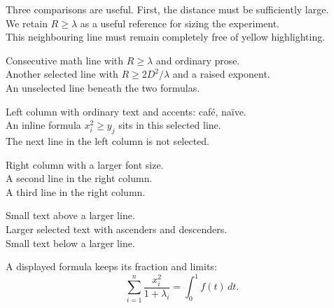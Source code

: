 \documentclass[a4paper,11pt]{article}
\begin{document}
Three comparisons are useful. First, the distance must be sufficiently large.\\
We retain $R\geq\lambda$ as a useful reference for sizing the experiment.\\
This neighbouring line must remain completely free of yellow highlighting.

\vspace{6mm}
Consecutive math line with $R\geq\lambda$ and ordinary prose.\\
Another selected line with $R\geq 2D^2/\lambda$ and a raised exponent.\\
An unselected line beneath the two formulas.

\vspace{1cm}
\begin{minipage}[t]{0.44\textwidth}
Left column with ordinary text and accents: caf\'e, na\"ive.\\
An inline formula $x_i^2\geq y_j$ sits in this selected line.\\
The next line in the left column is not selected.
\end{minipage}\hfill
\begin{minipage}[t]{0.44\textwidth}
\large Right column with a larger font size.\\
A second line in the right column.\\
A third line in the right column.
\end{minipage}

\vspace{1cm}
\small Small text above a larger line.\\
{\Large Larger selected text with ascenders and descenders.}\\[2pt]
\small Small text below a larger line.

\vspace{1cm}
A displayed formula keeps its fraction and limits:
\[
\sum_{i=1}^{n}\frac{x_i^2}{1+\lambda_i}=\int_0^1 f(t)\,dt.
\]
\end{document}
